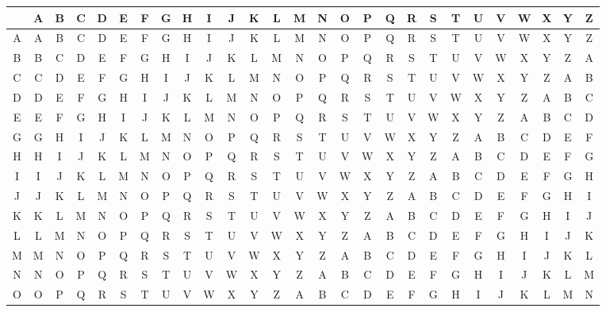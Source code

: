 \begin{figure}[h]
  \begin{center}
    \begin{tabular}{c|c@{}c@{}c@{}c@{}c@{}c@{}c@{}c@{}c@{}c@{}c@{}c@{}c@{}c@{}c@{}c@{}c@{}c@{}c@{}c@{}c@{}c@{}c@{}c@{}c@{}c}
        & A & B & C & D & E & F & G & H & I & J & K & L & M & N & O & P & Q & R & S & T & U & V & W & X & Y & Z \\
      \hline
      A & A & B & C & D & E & F & G & H & I & J & K & L & M & N & O & P & Q & R & S & T & U & V & W & X & Y & Z \\
      B & B & C & D & E & F & G & H & I & J & K & L & M & N & O & P & Q & R & S & T & U & V & W & X & Y & Z & A \\
      C & C & D & E & F & G & H & I & J & K & L & M & N & O & P & Q & R & S & T & U & V & W & X & Y & Z & A & B \\
      D & D & E & F & G & H & I & J & K & L & M & N & O & P & Q & R & S & T & U & V & W & X & Y & Z & A & B & C \\
      E & E & F & G & H & I & J & K & L & M & N & O & P & Q & R & S & T & U & V & W & X & Y & Z & A & B & C & D \\
      G & G & H & I & J & K & L & M & N & O & P & Q & R & S & T & U & V & W & X & Y & Z & A & B & C & D & E & F \\
      H & H & I & J & K & L & M & N & O & P & Q & R & S & T & U & V & W & X & Y & Z & A & B & C & D & E & F & G \\
      I & I & J & K & L & M & N & O & P & Q & R & S & T & U & V & W & X & Y & Z & A & B & C & D & E & F & G & H \\
      J & J & K & L & M & N & O & P & Q & R & S & T & U & V & W & X & Y & Z & A & B & C & D & E & F & G & H & I \\
      K & K & L & M & N & O & P & Q & R & S & T & U & V & W & X & Y & Z & A & B & C & D & E & F & G & H & I & J \\
      L & L & M & N & O & P & Q & R & S & T & U & V & W & X & Y & Z & A & B & C & D & E & F & G & H & I & J & K \\
      M & M & N & O & P & Q & R & S & T & U & V & W & X & Y & Z & A & B & C & D & E & F & G & H & I & J & K & L \\
      N & N & O & P & Q & R & S & T & U & V & W & X & Y & Z & A & B & C & D & E & F & G & H & I & J & K & L & M \\
      O & O & P & Q & R & S & T & U & V & W & X & Y & Z & A & B & C & D & E & F & G & H & I & J & K & L & M & N \\

\end{tabular}
\end{center}
\end{figure}
